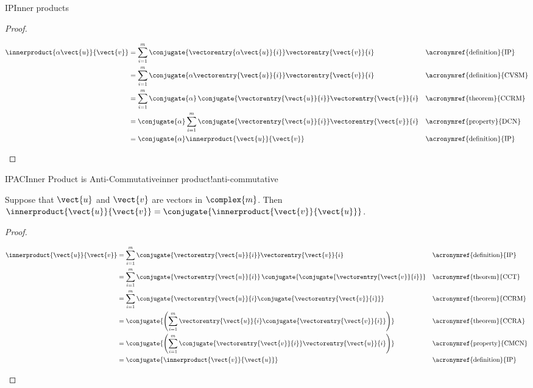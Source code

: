 \begin{subsect}{IP}{Inner products}
\begin{proof}
\begin{para}
%
\begin{align*}
\innerproduct{\alpha\vect{u}}{\vect{v}}
&=\sum_{i=1}^{m}\conjugate{\vectorentry{\alpha\vect{u}}{i}}\vectorentry{\vect{v}}{i}
&&\text{\acronymref{definition}{IP}}\\
%
&=\sum_{i=1}^{m}\conjugate{\alpha\vectorentry{\vect{u}}{i}}\vectorentry{\vect{v}}{i}
&&\text{\acronymref{definition}{CVSM}}\\
%
&=\sum_{i=1}^{m}\conjugate{\alpha}\,\conjugate{\vectorentry{\vect{u}}{i}}\vectorentry{\vect{v}}{i}
&&\text{\acronymref{theorem}{CCRM}}\\
%
&=\conjugate{\alpha}\sum_{i=1}^{m}\conjugate{\vectorentry{\vect{u}}{i}}\vectorentry{\vect{v}}{i}
&&\text{\acronymref{property}{DCN}}\\
%
&=\conjugate{\alpha}\innerproduct{\vect{u}}{\vect{v}}
&&\text{\acronymref{definition}{IP}}
%
\end{align*}
\end{para}
%
\end{proof}
%
\begin{theorem}{IPAC}{Inner Product is Anti-Commutative}{inner product!anti-commutative}
\begin{para}Suppose that $\vect{u}$ and $\vect{v}$ are vectors in $\complex{m}$.  Then
$\innerproduct{\vect{u}}{\vect{v}}=\conjugate{\innerproduct{\vect{v}}{\vect{u}}}$.\end{para}
\end{theorem}
%
\begin{proof}
\begin{para}
\begin{align*}
\innerproduct{\vect{u}}{\vect{v}}
&=\sum_{i=1}^{m}\conjugate{\vectorentry{\vect{u}}{i}}\vectorentry{\vect{v}}{i}
&&\text{\acronymref{definition}{IP}}\\
%
&=\sum_{i=1}^{m}\conjugate{\vectorentry{\vect{u}}{i}}\,\conjugate{\conjugate{\vectorentry{\vect{v}}{i}}}
&&\text{\acronymref{theorem}{CCT}}\\
%
&=\sum_{i=1}^{m}\conjugate{\vectorentry{\vect{u}}{i}\conjugate{\vectorentry{\vect{v}}{i}}}
&&\text{\acronymref{theorem}{CCRM}}\\
%
&=\conjugate{\left(\sum_{i=1}^{m}\vectorentry{\vect{u}}{i}\conjugate{\vectorentry{\vect{v}}{i}}\right)}
&&\text{\acronymref{theorem}{CCRA}}\\
%
&=\conjugate{\left(\sum_{i=1}^{m}\conjugate{\vectorentry{\vect{v}}{i}}\vectorentry{\vect{u}}{i}\right)}
&&\text{\acronymref{property}{CMCN}}\\
%
&=\conjugate{\innerproduct{\vect{v}}{\vect{u}}}
&&\text{\acronymref{definition}{IP}}\\
\end{align*}
\end{para}
\end{proof}
%
\end{subsect}
